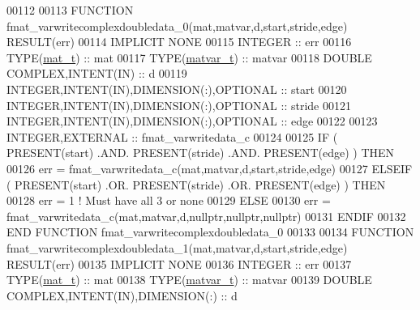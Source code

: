 \begin{DoxyCode}
00112 
00113 \textcolor{keyword}{FUNCTION }fmat\_varwritecomplexdoubledata\_0(mat,matvar,d,start,stride,edge) \textcolor{keyword}{RESULT}(err)
00114 \textcolor{keywordtype}{IMPLICIT NONE}
00115     \textcolor{keywordtype}{INTEGER}                                  :: err
00116     \textcolor{keywordtype}{TYPE}(\hyperlink{group___m_a_t_gab0fc888f5a5d79943b16284b1f91c2e8}{mat\_t})                              :: mat
00117     \textcolor{keywordtype}{TYPE}(\hyperlink{group___m_a_t_structmatvar__t}{matvar\_t})                           :: matvar
00118     \textcolor{keywordtype}{DOUBLE COMPLEX},\textcolor{keywordtype}{INTENT(IN)}                :: d
00119     \textcolor{keywordtype}{INTEGER},\textcolor{keywordtype}{INTENT(IN)},\textcolor{keywordtype}{DIMENSION(:)},\textcolor{keywordtype}{OPTIONAL} :: start
00120     \textcolor{keywordtype}{INTEGER},\textcolor{keywordtype}{INTENT(IN)},\textcolor{keywordtype}{DIMENSION(:)},\textcolor{keywordtype}{OPTIONAL} :: stride
00121     \textcolor{keywordtype}{INTEGER},\textcolor{keywordtype}{INTENT(IN)},\textcolor{keywordtype}{DIMENSION(:)},\textcolor{keywordtype}{OPTIONAL} :: edge
00122 
00123     \textcolor{keywordtype}{INTEGER},\textcolor{keywordtype}{EXTERNAL}                         :: fmat\_varwritedata\_c
00124 
00125     \textcolor{keywordflow}{IF} ( \textcolor{keyword}{PRESENT}(start) .AND. \textcolor{keyword}{PRESENT}(stride) .AND. \textcolor{keyword}{PRESENT}(edge) ) \textcolor{keywordflow}{THEN}
00126         err = fmat\_varwritedata\_c(mat,matvar,d,start,stride,edge)
00127     \textcolor{keywordflow}{ELSEIF} ( \textcolor{keyword}{PRESENT}(start) .OR. \textcolor{keyword}{PRESENT}(stride) .OR. \textcolor{keyword}{PRESENT}(edge) ) \textcolor{keywordflow}{THEN}
00128         err = 1    \textcolor{comment}{! Must have all 3 or none}
00129     \textcolor{keywordflow}{ELSE}
00130         err = fmat\_varwritedata\_c(mat,matvar,d,nullptr,nullptr,nullptr)
00131 \textcolor{keywordflow}{    ENDIF}
00132 \textcolor{keyword}{END FUNCTION }fmat\_varwritecomplexdoubledata\_0
00133 
00134 \textcolor{keyword}{FUNCTION }fmat\_varwritecomplexdoubledata\_1(mat,matvar,d,start,stride,edge) \textcolor{keyword}{RESULT}(err)
00135 \textcolor{keywordtype}{IMPLICIT NONE}
00136     \textcolor{keywordtype}{INTEGER}                                  :: err
00137     \textcolor{keywordtype}{TYPE}(\hyperlink{group___m_a_t_gab0fc888f5a5d79943b16284b1f91c2e8}{mat\_t})                              :: mat
00138     \textcolor{keywordtype}{TYPE}(\hyperlink{group___m_a_t_structmatvar__t}{matvar\_t})                           :: matvar
00139     \textcolor{keywordtype}{DOUBLE COMPLEX},\textcolor{keywordtype}{INTENT(IN)},\textcolor{keywordtype}{DIMENSION(:)}   :: d

\end{DoxyCode}
